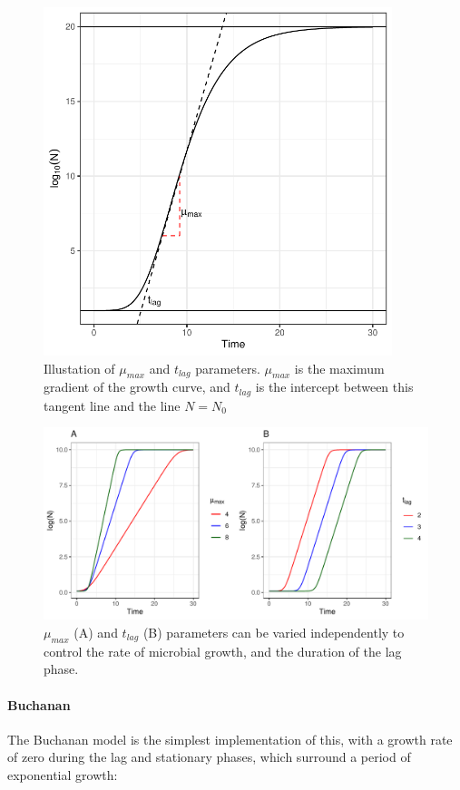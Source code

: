 \documentclass[11pt, a4paper]{article}
\begin{document}
\begin{linenumbers}
        \begin{figure}[H]
        \centering
        \includegraphics[width=4in]{../results/4_param_demo.pdf}
        \caption{Illustation of $\mu_{max}$ and $t_{lag}$ parameters. $\mu_{max}$ is the maximum gradient of the growth curve, and $t_{lag}$ is the intercept between this tangent line and the line $N = N_0$}
        \label{fig:4_param_demo}
        \end{figure}


        \begin{figure}[H]
        \includegraphics[width=\linewidth]{../results/tlag_rmax_demo.pdf}
        \caption{ $\mu_{max}$ (A) and $t_{lag}$ (B) parameters can be varied independently to control the rate of microbial growth, and the duration of the lag phase.}
        \label{fig:parameter_variation_demo}
        \end{figure}



\paragraph{Buchanan}
The Buchanan model \cite{Buchanan} is the simplest implementation of this, with a growth rate of zero during the lag and stationary phases, which surround a period of exponential growth:


\end{linenumbers}
\end{document}
